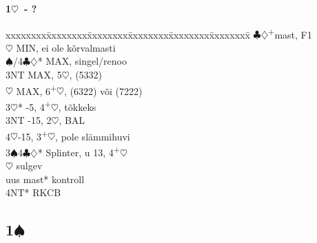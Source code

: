 \documentclass[10pt]{article}
\renewcommand{\c}{$\clubsuit$}
\renewcommand{\d}{$\diamondsuit$}
\newcommand{\h}{$\heartsuit$}
\newcommand{\s}{$\spadesuit$}
\newcommand{\p}{\textsuperscript{+}}
\newcommand{\m}{\textsuperscript{\textminus}}
\newenvironment{bidtable}[1][]
{\textbf{#1}
  \begin{adjustwidth}{1em}{}
    \addvspace{2pt}
    \begin{tabbing}
      xxxxxxxx\=xxxxxxxx\=xxxxxxxx\=xxxxxxxx\=xxxxxxxx\=xxxxxxxx\=\kill}
{\end{tabbing}\end{adjustwidth}\bigskip}%
\newcommand{\pdfs}{\texorpdfstring{\s{}}{S}}
\begin{document}
\begin{multicols*}{2}
\begin{bidtable}[1\h\ - ?]
           \c\d      {}\p mast, F1                  \\
           \h        \> MIN, ei ole kõrvalmasti       \\
           \s/4\c\d* \> MAX, singel/renoo             \\
           \> 3NT        \> MAX, 5\h, (5332)              \\
           \h        \> MAX, 6\p\h, (6322) või (7222) \\
3\h*       {}-5, 4\p\h, tõkkeks                         \\
3NT        -15, 2\m\h, BAL                           \\
4\h        {}-15, 3\p\h, pole slämmihuvi               \\
3\s 4\c\d* \> Splinter, u 13, 4\p\h                       \\
           \h        \> sulgev                        \\
           \> uus mast*  \> kontroll                      \\
           \> 4NT*       \> RKCB
\end{bidtable}



\subsection{1\pdfs}


\end{multicols*}
\end{document}
